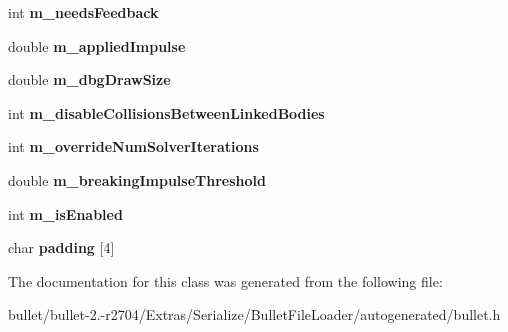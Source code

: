 \begin{DoxyCompactItemize}
\item 
\hypertarget{class_bullet_1_1bt_typed_constraint_double_data_a3eb086dbfdda8a9048a0b3ea2ad77672}{int {\bfseries m\+\_\+needs\+Feedback}}\label{class_bullet_1_1bt_typed_constraint_double_data_a3eb086dbfdda8a9048a0b3ea2ad77672}

\item 
\hypertarget{class_bullet_1_1bt_typed_constraint_double_data_ac6c07203efc5f75adff4bd2ec8450389}{double {\bfseries m\+\_\+applied\+Impulse}}\label{class_bullet_1_1bt_typed_constraint_double_data_ac6c07203efc5f75adff4bd2ec8450389}

\item 
\hypertarget{class_bullet_1_1bt_typed_constraint_double_data_ab81004aa8d0679e8bca92203386f95f7}{double {\bfseries m\+\_\+dbg\+Draw\+Size}}\label{class_bullet_1_1bt_typed_constraint_double_data_ab81004aa8d0679e8bca92203386f95f7}

\item 
\hypertarget{class_bullet_1_1bt_typed_constraint_double_data_a4eb9879a16727405c775372ef95711f2}{int {\bfseries m\+\_\+disable\+Collisions\+Between\+Linked\+Bodies}}\label{class_bullet_1_1bt_typed_constraint_double_data_a4eb9879a16727405c775372ef95711f2}

\item 
\hypertarget{class_bullet_1_1bt_typed_constraint_double_data_abe1aeddbdf2ffd8d1e62b6b64010d019}{int {\bfseries m\+\_\+override\+Num\+Solver\+Iterations}}\label{class_bullet_1_1bt_typed_constraint_double_data_abe1aeddbdf2ffd8d1e62b6b64010d019}

\item 
\hypertarget{class_bullet_1_1bt_typed_constraint_double_data_a950b12193520f676746dcc7d92e3d539}{double {\bfseries m\+\_\+breaking\+Impulse\+Threshold}}\label{class_bullet_1_1bt_typed_constraint_double_data_a950b12193520f676746dcc7d92e3d539}

\item 
\hypertarget{class_bullet_1_1bt_typed_constraint_double_data_a9dd8f581fcc39ae2e2ee4254c673902a}{int {\bfseries m\+\_\+is\+Enabled}}\label{class_bullet_1_1bt_typed_constraint_double_data_a9dd8f581fcc39ae2e2ee4254c673902a}

\item 
\hypertarget{class_bullet_1_1bt_typed_constraint_double_data_a533656e5c2fb2223e7095a698aceed85}{char {\bfseries padding} \mbox{[}4\mbox{]}}\label{class_bullet_1_1bt_typed_constraint_double_data_a533656e5c2fb2223e7095a698aceed85}

\end{DoxyCompactItemize}


The documentation for this class was generated from the following file\+:\begin{DoxyCompactItemize}
\item 
bullet/bullet-\/2.-\/r2704/\+Extras/\+Serialize/\+Bullet\+File\+Loader/autogenerated/bullet.\+h\end{DoxyCompactItemize}
